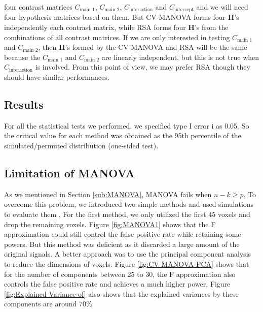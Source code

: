 four contrast matrices $C_{\text{main 1}}$, $C_{\text{main 2}}$,
$C_{\text{interaction}}$ and $C_{\text{intercept}}$ and we will
need four hypothesis matrices based on them. But CV-MANOVA forms four
$\boldsymbol{H}$'s independently each contrast matrix, while RSA
forms four $\boldsymbol{H}$'s from the combinations of all contrast
matrices. If we are only interested in testing $C_{\text{main 1}}$
and $C_{\text{main 2}}$, then $\boldsymbol{H}$'s formed by the CV-MANOVA
and RSA will be the same because the $C_{\text{main 1}}$ and $C_{\text{main 2}}$
are linearly independent, but this is not true when $C_{\text{interaction}}$
is involved. From this point of view, we may prefer RSA though they
should have similar performances.


\subsection{Results}

For all the statistical tests we performed, we specified type I error
i as 0.05. So the critical value for each method was obtained as the
95th percentile of the simulated/permuted distribution (one-sided
test).


\subsection{Limitation of MANOVA}

As we mentioned in Section \ref{sub:MANOVA}, MANOVA fails when $n-k\ge p$.
To overcome this problem, we introduced two simple methods and used
simulations to evaluate them . For the first method, we only utilized
the first 45 voxels and drop the remaining voxels. Figure \ref{fig:MANOVA1}
shows that the F approximation could still control the false positive
rate while retaining some powers. But this method was deficient as
it discarded a large amount of the original signals. A better approach
was to use the principal component analysis to reduce the dimensions
of voxels. Figure \ref{fig:CV-MANOVA-PCA} shows that for the number
of components between 25 to 30, the F approximation also controls
the false positive rate and achieves a much higher power. Figure \ref{fig:Explained-Variance-of}
also shows that the explained variances by these components are around
$70\%$.

